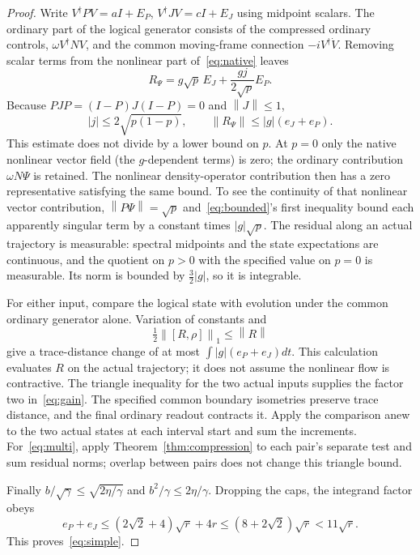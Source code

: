 \documentclass[11pt]{article}
\newcommand{\norm}[1]{\left\lVert#1\right\rVert}
\begin{document}
\begin{proof}
Write $V^\dagger PV=aI+E_P$, $V^\dagger JV=cI+E_J$ using midpoint scalars. The ordinary part of the logical generator consists of the compressed ordinary controls, $\omega V^\dagger NV$, and the common moving-frame connection $-iV^\dagger\dot V$. Removing scalar terms from the nonlinear part of~\eqref{eq:native} leaves
\begin{equation}
 R_\Psi=g\sqrt p\,E_J+\frac{gj}{2\sqrt p}E_P.\label{eq:residual}
\end{equation}
Because $PJP=(I-P)J(I-P)=0$ and $\norm J\leq1$,
\begin{equation}
 |j|\leq2\sqrt{p(1-p)},\qquad
 \norm{R_\Psi}\leq|g|(e_J+e_P).\label{eq:bounded}
\end{equation}
This estimate does not divide by a lower bound on $p$. At $p=0$ only the native nonlinear vector field (the $g$-dependent terms) is zero; the ordinary contribution $\omega N\Psi$ is retained. The nonlinear density-operator contribution then has a zero representative satisfying the same bound. To see the continuity of that nonlinear vector contribution, $\norm{P\Psi}=\sqrt p$ and~\eqref{eq:bounded}'s first inequality bound each apparently singular term by a constant times $|g|\sqrt p$. The residual along an actual trajectory is measurable: spectral midpoints and the state expectations are continuous, and the quotient on $p>0$ with the specified value on $p=0$ is measurable. Its norm is bounded by $\tfrac32|g|$, so it is integrable.

For either input, compare the logical state with evolution under the common ordinary generator alone. Variation of constants and
\begin{equation}
 \tfrac12\norm{[R,\rho]}_1\leq\norm R
\end{equation}
give a trace-distance change of at most $\int|g|(e_P+e_J)dt$. This calculation evaluates $R$ on the actual trajectory; it does not assume the nonlinear flow is contractive. The triangle inequality for the two actual inputs supplies the factor two in~\eqref{eq:gain}. The specified common boundary isometries preserve trace distance, and the final ordinary readout contracts it. Apply the comparison anew to the two actual states at each interval start and sum the increments. For~\eqref{eq:multi}, apply Theorem~\ref{thm:compression} to each pair's separate test and sum residual norms; overlap between pairs does not change this triangle bound.

Finally $b/\sqrt\gamma\leq\sqrt{2\eta/\gamma}$ and $b^2/\gamma\leq2\eta/\gamma$. Dropping the caps, the integrand factor obeys
\[
 e_P+e_J\leq(2\sqrt2+4)\sqrt r+4r
 \leq(8+2\sqrt2)\sqrt r<11\sqrt r.
\]
This proves~\eqref{eq:simple}.
\end{proof}
\end{document}
